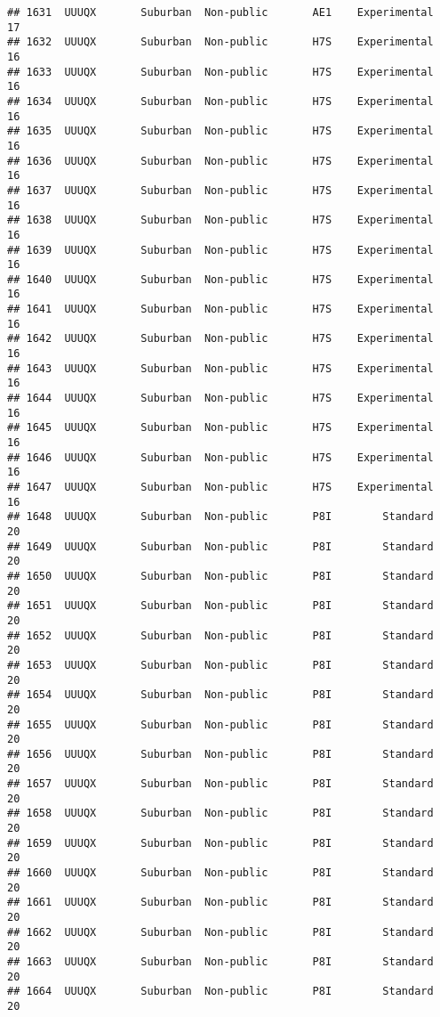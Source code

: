 \documentclass[
]{article}
\begin{document}
\begin{verbatim}
## 1631  UUUQX       Suburban  Non-public       AE1    Experimental        17
## 1632  UUUQX       Suburban  Non-public       H7S    Experimental        16
## 1633  UUUQX       Suburban  Non-public       H7S    Experimental        16
## 1634  UUUQX       Suburban  Non-public       H7S    Experimental        16
## 1635  UUUQX       Suburban  Non-public       H7S    Experimental        16
## 1636  UUUQX       Suburban  Non-public       H7S    Experimental        16
## 1637  UUUQX       Suburban  Non-public       H7S    Experimental        16
## 1638  UUUQX       Suburban  Non-public       H7S    Experimental        16
## 1639  UUUQX       Suburban  Non-public       H7S    Experimental        16
## 1640  UUUQX       Suburban  Non-public       H7S    Experimental        16
## 1641  UUUQX       Suburban  Non-public       H7S    Experimental        16
## 1642  UUUQX       Suburban  Non-public       H7S    Experimental        16
## 1643  UUUQX       Suburban  Non-public       H7S    Experimental        16
## 1644  UUUQX       Suburban  Non-public       H7S    Experimental        16
## 1645  UUUQX       Suburban  Non-public       H7S    Experimental        16
## 1646  UUUQX       Suburban  Non-public       H7S    Experimental        16
## 1647  UUUQX       Suburban  Non-public       H7S    Experimental        16
## 1648  UUUQX       Suburban  Non-public       P8I        Standard        20
## 1649  UUUQX       Suburban  Non-public       P8I        Standard        20
## 1650  UUUQX       Suburban  Non-public       P8I        Standard        20
## 1651  UUUQX       Suburban  Non-public       P8I        Standard        20
## 1652  UUUQX       Suburban  Non-public       P8I        Standard        20
## 1653  UUUQX       Suburban  Non-public       P8I        Standard        20
## 1654  UUUQX       Suburban  Non-public       P8I        Standard        20
## 1655  UUUQX       Suburban  Non-public       P8I        Standard        20
## 1656  UUUQX       Suburban  Non-public       P8I        Standard        20
## 1657  UUUQX       Suburban  Non-public       P8I        Standard        20
## 1658  UUUQX       Suburban  Non-public       P8I        Standard        20
## 1659  UUUQX       Suburban  Non-public       P8I        Standard        20
## 1660  UUUQX       Suburban  Non-public       P8I        Standard        20
## 1661  UUUQX       Suburban  Non-public       P8I        Standard        20
## 1662  UUUQX       Suburban  Non-public       P8I        Standard        20
## 1663  UUUQX       Suburban  Non-public       P8I        Standard        20
## 1664  UUUQX       Suburban  Non-public       P8I        Standard        20

\end{verbatim}
\end{document}
